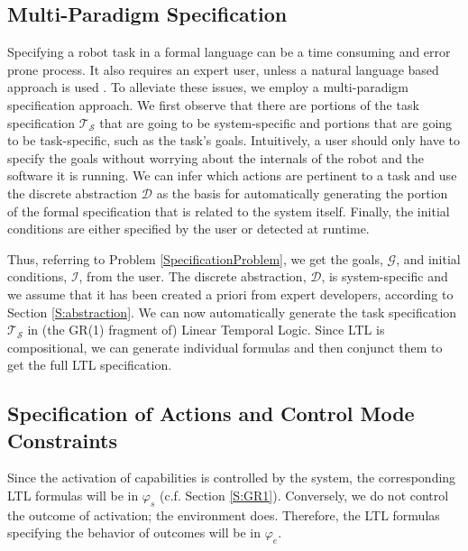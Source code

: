 
\subsection{Multi-Paradigm Specification}

Specifying a robot task in a formal language can be a time consuming and error prone process.
It also requires an expert user, unless a natural language based approach is used \cite{Lignos2015AURO}. 
To alleviate these issues, we employ a multi-paradigm specification approach. 
We first observe that there are portions of the task specification $\mathcal{T}_\mathcal{S}$ that are going to be system-specific and portions that are going to be task-specific, such as the task's goals.
Intuitively, a user should only have to specify the goals without worrying about the internals of the robot and the software it is running.
We can infer which actions are pertinent to a task and use the discrete abstraction $\mathcal{D}$ as the basis for automatically generating the portion of the formal specification that is related to the system itself.
Finally, the initial conditions are either specified by the user or detected at runtime.

Thus, referring to Problem \ref{SpecificationProblem}, we get the goals, $\mathcal{G}$, and initial conditions, $\mathcal{I}$, from the user.
The discrete abstraction, $\mathcal{D}$, is system-specific and we assume that it has been created a priori from expert developers, according to Section \ref{S:abstraction}.
We can now automatically generate the task specification $\mathcal{T}_\mathcal{S}$ in (the GR(1) fragment \cite{Bloem2012GR1} of) Linear Temporal Logic.
Since LTL is compositional, we can generate individual formulas and then conjunct them to get the full LTL specification.


\subsection{Specification of Actions and Control Mode Constraints}

Since the activation of capabilities is controlled by the system, the corresponding LTL formulas will be in $\varphi_s$ (c.f. Section \ref{S:GR1}).
Conversely, we do not control the outcome of activation; the environment does.
Therefore, the LTL formulas specifying the behavior of outcomes will be in $\varphi_e$.

